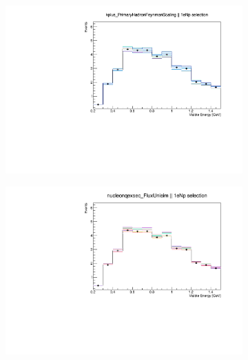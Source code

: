 \documentclass[a4paper]{article}
\begin{document}
\begin{figure}[ht] 
\begin{center}
    \begin{subfigure}[b]{0.33\textwidth}
    \centering
    \includegraphics[width=1.00\textwidth]{systvariations/Variation_nue_reco_e_genietune_run1_fluxonly_kplus_PrimaryHadronFeynmanScaling_nu_uBooNE_nue_intrinsic.pdf}
    \end{subfigure}
    \begin{subfigure}[b]{0.33\textwidth}
    \centering
    \includegraphics[width=1.00\textwidth]{systvariations/Variation_nue_reco_e_genietune_run1_fluxonly_nucleonqexsec_FluxUnisim_nu_uBooNE_nue_intrinsic.pdf}

\end{subfigure}
\end{center}
\end{figure}
\end{document}
